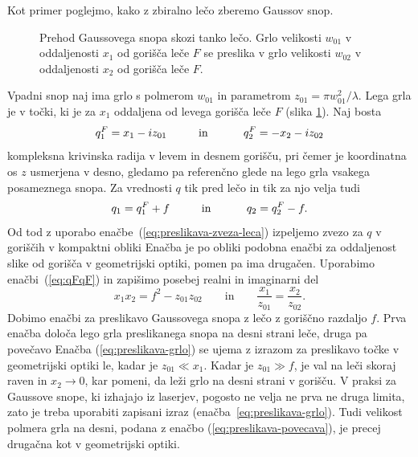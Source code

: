 Kot primer poglejmo, kako z zbiralno lečo zberemo Gaussov snop.
\begin{figure}[h]
\centering
\def\svgwidth{140truemm} 

\caption{Prehod Gaussovega snopa skozi
tanko lečo. Grlo velikosti $w_{01}$ v oddaljenosti $x_{1}$ od gorišča
leče $F$ se preslika v grlo velikosti $w_{02}$ v oddaljenosti $x_{2}$ od gorišča
leče $F$.}
\label{fig:Prehod-Gaussovega-snopa}
\end{figure}

Vpadni snop naj ima grlo s polmerom $w_{01}$ in parametrom $z_{01}=\pi w_{01}^2/\lambda$. 
Lega grla je 
v točki, ki je za $x_{1}$ oddaljena od levega gorišča leče $F$ (slika
\ref{fig:Prehod-Gaussovega-snopa}). Naj bosta 
\begin{equation}
q_{1}^{F}=x_{1}-iz_{01}\mbox{\hskip1cm in \hskip1cm}q_{2}^{F}=-x_{2}-iz_{02}
\label{eq:qFqF}
\end{equation}
 kompleksna krivinska radija v levem in desnem gorišču, pri čemer je koordinatna os $z$ 
 usmerjena v desno, gledamo pa referenčno glede na lego grla vsakega posameznega snopa. 
 Za vrednosti $q$ tik pred lečo in tik za njo velja tudi
\begin{equation}
q_{1}=q_{1}^{F}+f\mbox{\hskip1cm in \hskip1cm}q_{2}=q_{2}^{F}-f.
\end{equation}
 Od tod z uporabo enačbe~(\ref{eq:preslikava-zveza-leca}) izpeljemo zvezo
za $q$ v goriščih v kompaktni obliki 
 Enačba je po obliki podobna enačbi za oddaljenost slike od gorišča v
geometrijski optiki, pomen pa ima drugačen. Uporabimo enačbi~(\ref{eq:qFqF}) in 
zapišimo posebej realni in imaginarni del 
\begin{equation}
x_{1}x_{2}=f^{2}-z_{01}z_{02} \qquad \mathrm{in} \qquad
\frac{x_{1}}{z_{01}}=\frac{x_{2}}{z_{02}}.
\end{equation}
Dobimo enačbi za preslikavo Gaussovega snopa z lečo z goriščno razdaljo $f$.
Prva enačba 
določa lego grla preslikanega snopa na desni strani leče, druga pa povečavo
Enačba (\ref{eq:preslikava-grlo}) se ujema z izrazom za preslikavo točke v geometrijski
optiki le, kadar je $z_{01}\ll x_{1}$. Kadar je $z_{01}\gg f$, je
val na leči skoraj raven in $x_2 \to 0$, kar pomeni, da leži
grlo na desni strani v gorišču. V praksi za Gaussove snope, ki izhajajo iz laserjev, pogosto ne
velja ne prva ne druga limita, zato je treba uporabiti zapisani izraz 
(enačba~\ref{eq:preslikava-grlo}).
Tudi velikost polmera grla na desni, podana z enačbo (\ref{eq:preslikava-povecava}),
je precej drugačna kot v geometrijski optiki.

